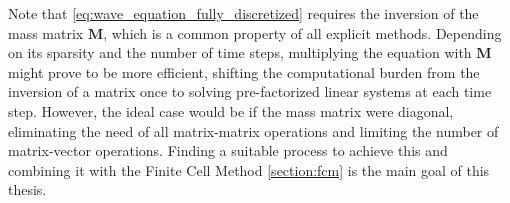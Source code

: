 Note that \ref{eq:wave_equation_fully_discretized} requires the inversion of the mass matrix $\mathbf M$, which is a common property of all explicit methods. Depending on its sparsity and the number of time steps, multiplying the equation with $\mathbf M$ might prove to be more efficient, shifting the computational burden from the inversion of a matrix once to solving pre-factorized linear systems at each time step. However, the ideal case would be if the mass matrix were diagonal, eliminating the need of all matrix-matrix operations and limiting the number of matrix-vector operations. Finding a suitable process to achieve this and combining it with the Finite Cell Method \ref{section:fcm} is the main goal of this thesis.